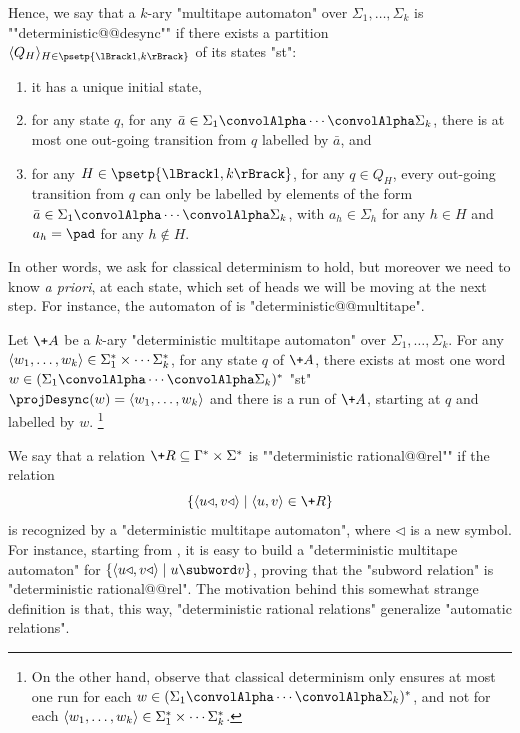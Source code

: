 Hence, we say that a $k$-ary "multitape automaton" over $\Sigma_1,\hdots,\Sigma_k$
is ""deterministic@@desync"" if
there exists a partition $\tup{Q_H}_{H \in \psetp{\lBrack 1,k\rBrack}}$ of its states "st":
\begin{enumerate}
	\item it has a unique initial state,
	\item for any state $q$, for any $\bar a \in \Sigma_1\convolAlpha\cdots\convolAlpha\Sigma_k$,
		there is at most one out-going transition from $q$ labelled by $\bar a$, and
	\item for any $H\in\psetp{\lBrack 1,k\rBrack}$, for any $q \in Q_H$,
		every out-going transition from $q$ can only be labelled by elements of
		the form $\bar a \in \Sigma_1\convolAlpha\cdots\convolAlpha\Sigma_k$, with
		$a_h \in \Sigma_h$ for any $h\in H$ and $a_h = \pad$ for any $h\not\in H$.
\end{enumerate}
In other words, we ask for classical determinism to hold, but moreover we need to know \emph{a priori}, at each state, which set of heads we will be moving at the next step.
For instance, the automaton of  is "deterministic@@multitape".

\begin{claim}
	\label{claim:tool-deterministic-rational}
	Let $\+A$ be a $k$-ary "deterministic multitape automaton" over $\Sigma_1,\hdots,\Sigma_k$.
	For any $\langle w_1,\hdots,w_k\rangle \in \Sigma_1^* \times \cdots \Sigma_k^*$,
	for any state $q$ of $\+A$, there exists at most
	one word $w \in (\Sigma_1\convolAlpha\cdots\convolAlpha\Sigma_k)^*$ "st" $\projDesync(w) = \tup{w_1,\hdots,w_k}$ and there is a run of $\+A$, starting at $q$ and labelled by $w$.%
	\footnote{On the other hand, observe that classical determinism only ensures
	at most one run for each $w \in (\Sigma_1\convolAlpha\cdots\convolAlpha\Sigma_k)^*$,
	and not for each $\langle w_1,\hdots,w_k\rangle \in \Sigma_1^* \times \cdots \Sigma_k^*$.}
\end{claim}

We say that a relation $\+R \subseteq \Gamma^* \times \Sigma^*$ is ""deterministic rational@@rel""
if the relation
\[
	\{\tup{u\triangleleft, v\triangleleft} \mid \tup{u,v} \in \+R\}
\]
is recognized by a "deterministic multitape automaton", where $\triangleleft$ is a new symbol.
For instance, starting from , it is easy
to build a "deterministic multitape automaton" for
$\{\tup{u\triangleleft, v\triangleleft} \mid u \subword v\}$,
proving that the "subword relation" is "deterministic rational@@rel".
The motivation behind this somewhat strange definition is that, this way,
"deterministic rational relations" generalize "automatic relations".

